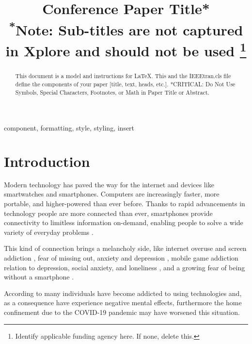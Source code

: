 \documentclass[conference]{IEEEtran}
\begin{document}
\title{Conference Paper Title*\\
{\footnotesize \textsuperscript{*}Note: Sub-titles are not captured in Xplore and
should not be used}
\thanks{Identify applicable funding agency here. If none, delete this.}
}

\author{
}

\maketitle

\begin{abstract}
This document is a model and instructions for \LaTeX.
This and the IEEEtran.cls file define the components of your paper [title, text, heads, etc.]. *CRITICAL: Do Not Use Symbols, Special Characters, Footnotes, 
or Math in Paper Title or Abstract.
\end{abstract}

\begin{IEEEkeywords}
component, formatting, style, styling, insert
\end{IEEEkeywords}

\section{Introduction}
Modern technology has paved the way for the internet and devices like  smartwatches and smartphones. Computers are increasingly faster, more portable, and higher-powered than ever before. Thanks to rapid advancements in technology people are more connected than ever, smartphones provide connectivity to limitless information on-demand, enabling people to solve a wide variety of everyday problems \cite{b1}. 

This kind of connection brings a melancholy side, like internet overuse and screen addiction \cite{b2}, fear of missing out, anxiety and depression \cite{b3}, mobile game addiction relation to depression, social anxiety, and loneliness \cite{b4}, and a growing fear of being without a smartphone \cite{b5}. 

According to \cite{b6} many individuals have become addicted to using technologies and, as a consequence have experience negative mental effects, furthermore the home confinement due to the COVID-19 pandemic may have worsened this situation.
\end{document}
